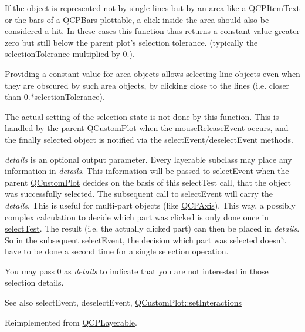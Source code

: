 \-If the object is represented not by single lines but by an area like a \hyperlink{classQCPItemText}{\-Q\-C\-P\-Item\-Text} or the bars of a \hyperlink{classQCPBars}{\-Q\-C\-P\-Bars} plottable, a click inside the area should also be considered a hit. \-In these cases this function thus returns a constant value greater zero but still below the parent plot's selection tolerance. (typically the selection\-Tolerance multiplied by 0.).

\-Providing a constant value for area objects allows selecting line objects even when they are obscured by such area objects, by clicking close to the lines (i.\-e. closer than 0.$\ast$selection\-Tolerance).

\-The actual setting of the selection state is not done by this function. \-This is handled by the parent \hyperlink{classQCustomPlot}{\-Q\-Custom\-Plot} when the mouse\-Release\-Event occurs, and the finally selected object is notified via the select\-Event/deselect\-Event methods.

{\itshape details\/} is an optional output parameter. \-Every layerable subclass may place any information in {\itshape details\/}. \-This information will be passed to select\-Event when the parent \hyperlink{classQCustomPlot}{\-Q\-Custom\-Plot} decides on the basis of this select\-Test call, that the object was successfully selected. \-The subsequent call to select\-Event will carry the {\itshape details\/}. \-This is useful for multi-\/part objects (like \hyperlink{classQCPAxis}{\-Q\-C\-P\-Axis}). \-This way, a possibly complex calculation to decide which part was clicked is only done once in \hyperlink{classQCPAbstractItem_a96d522d10ffc0413b9a366c6f7f0476b}{select\-Test}. \-The result (i.\-e. the actually clicked part) can then be placed in {\itshape details\/}. \-So in the subsequent select\-Event, the decision which part was selected doesn't have to be done a second time for a single selection operation.

\-You may pass 0 as {\itshape details\/} to indicate that you are not interested in those selection details.

\begin{DoxySeeAlso}{\-See also}
select\-Event, deselect\-Event, \hyperlink{classQCustomPlot_a5ee1e2f6ae27419deca53e75907c27e5}{\-Q\-Custom\-Plot\-::set\-Interactions} 
\end{DoxySeeAlso}


\-Reimplemented from \hyperlink{classQCPLayerable_a4001c4d0dfec55598efa4d531f2179a9}{\-Q\-C\-P\-Layerable}.



